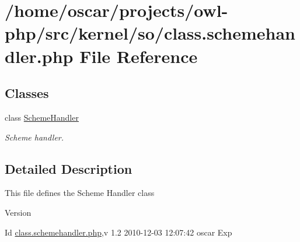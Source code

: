 \section{/home/oscar/projects/owl-\/php/src/kernel/so/class.schemehandler.php File Reference}
\label{class_8schemehandler_8php}
\subsection*{Classes}
\begin{DoxyCompactItemize}
\item 
class \hyperlink{classSchemeHandler}{SchemeHandler}
\begin{DoxyCompactList}\small\item\em Scheme handler. \item\end{DoxyCompactList}\end{DoxyCompactItemize}


\subsection{Detailed Description}
This file defines the Scheme Handler class \begin{DoxyVersion}{Version}

\end{DoxyVersion}
\begin{DoxyParagraph}{Id}
\hyperlink{class_8schemehandler_8php}{class.schemehandler.php},v 1.2 2010-\/12-\/03 12:07:42 oscar Exp 
\end{DoxyParagraph}
